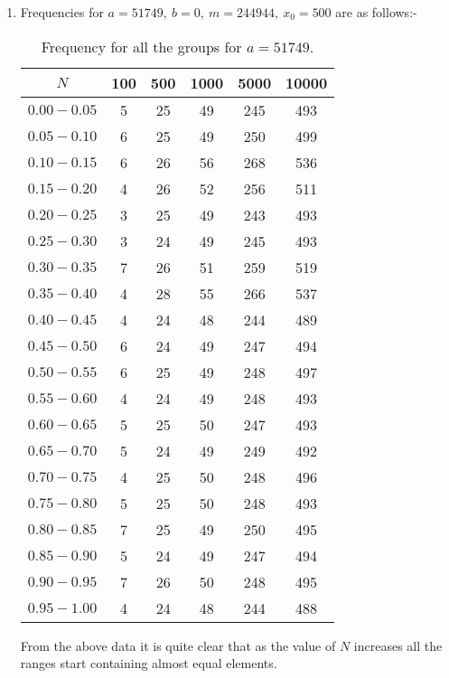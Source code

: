 \documentclass[10pt]{article}
\begin{document}
\begin{enumerate}
\pagebreak

\item Frequencies for $a = 51749,\: b = 0, \: m = 244944,\: x_0 = 500$ are as follows:- 

\begin{table}[H]
\begin{center}
\begin{tabular}{|c|c|c|c|c|c|}
\hline
$N$ & 100 & 500 & 1000 & 5000 & 10000\\
\hline
$0.00-0.05$ & 5 & 25 & 49 & 245 & 493\\
\hline
$0.05-0.10$ & 6 & 25 & 49 & 250 & 499\\
\hline
$0.10-0.15$ & 6 & 26 & 56 & 268 & 536\\
\hline
$0.15-0.20$ & 4 & 26 & 52 & 256 & 511\\
\hline
$0.20-0.25$ & 3 & 25 & 49 & 243 & 493\\
\hline
$0.25-0.30$ & 3 & 24 & 49 & 245 & 493\\
\hline
$0.30-0.35$ & 7 & 26 & 51 & 259 & 519\\
\hline
$0.35-0.40$ & 4 & 28 & 55 & 266 & 537\\
\hline
$0.40-0.45$ & 4 & 24 & 48 & 244 & 489\\
\hline
$0.45-0.50$ & 6 & 24 & 49 & 247 & 494\\
\hline
$0.50-0.55$ & 6 & 25 & 49 & 248 & 497\\
\hline
$0.55-0.60$ & 4 & 24 & 49 & 248 & 493\\
\hline
$0.60-0.65$ & 5 & 25 & 50 & 247 & 493\\
\hline
$0.65-0.70$ & 5 & 24 & 49 & 249 & 492\\
\hline
$0.70-0.75$ & 4 & 25 & 50 & 248 & 496\\
\hline
$0.75-0.80$ & 5 & 25 & 50 & 248 & 493\\
\hline
$0.80-0.85$ & 7 & 25 & 49 & 250 & 495\\
\hline
$0.85-0.90$ & 5& 24 & 49 & 247 & 494\\
\hline
$0.90-0.95$ & 7 & 26 & 50 & 248 & 495\\
\hline
$0.95-1.00$ & 4 & 24 & 48 & 244 & 488\\
\hline
\end{tabular}
\end{center}
\caption{Frequency for all the groups for $a = 51749$.}
\label{tab:q2_seq2}
\end{table}
\medskip
From the above data it is quite clear that as the value of $N$ increases all the ranges start containing almost equal elements.

\end{enumerate}
\end{document}
